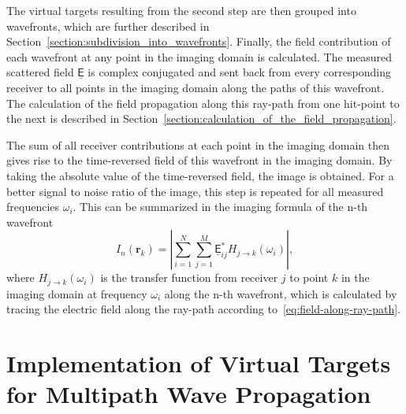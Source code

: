 The virtual targets resulting from the second step are then grouped into wavefronts, which are further described in Section~\ref{section:subdivision_into_wavefronts}.
Finally, the field contribution of each wavefront at any point in the imaging domain is calculated.
The measured scattered field \(\underline{\mathsf{E}}\) is complex conjugated and sent back from every corresponding receiver to all points in the imaging domain along the paths of this wavefront.
The calculation of the field propagation along this ray-path from one hit-point to the next is described in Section~\ref{section:calculation_of_the_field_propagation}.

The sum of all receiver contributions at each point in the imaging domain then gives rise to the time-reversed field of this wavefront in the imaging domain.
By taking the absolute value of the time-reversed field, the image is obtained.
For a better signal to noise ratio of the image, this step is repeated for all measured frequencies \(\omega_i\).
This can be summarized in the imaging formula of the n-th wavefront
\begin{equation}
    I_n(\bm{r}_k) = |\sum_{i=1}^{N} \sum_{j=1}^{M} \underline{\mathsf{E}}_{ij}^* H_{j \rightarrow k}(\omega_i)|,
\end{equation}
where \(H_{j \rightarrow k}(\omega_i)\) is the transfer function from receiver \(j\) to point \(k\) in the imaging domain at frequency \(\omega_i\) along the n-th wavefront, which is calculated by tracing the electric field along the ray-path according to~\eqref{eq:field-along-ray-path}.


\section{Implementation of Virtual Targets for Multipath Wave Propagation}\label{section:virtual_targets}

